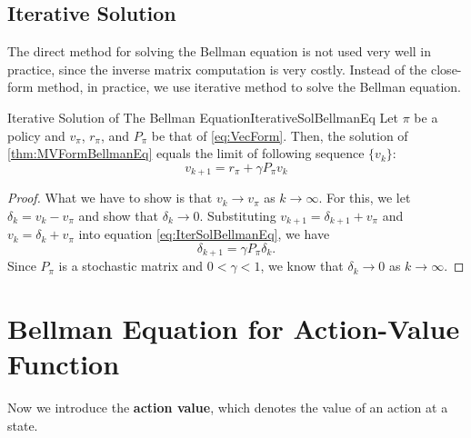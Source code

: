     \subsection{Iterative Solution}
        The direct method for solving the Bellman equation is not used very well in practice, since the inverse matrix computation is very costly.
        Instead of the close-form method, in practice, we use iterative method to solve the Bellman equation.
        \begin{thm}{Iterative Solution of The Bellman Equation}{IterativeSolBellmanEq}
            Let $\pi$ be a policy and $v_\pi$, $r_\pi$, and $P_\pi$ be that of \ref{eq:VecForm}. Then, the
            solution of \ref{thm:MVFormBellmanEq} equals the limit of following sequence $\{v_k\}$:
            \begin{equation}
                v_{k+1}=r_\pi + \gamma P_\pi v_k \label{eq:IterSolBellmanEq}
            \end{equation}
        \end{thm}
        \begin{proof}
            What we have to show is that $v_k \to v_\pi$ as $k \to \infty$. For this, we let $\delta_k = v_k - v_\pi$ and show that $\delta_k \to 0$.
            Substituting $v_{k+1} = \delta_{k+1} + v_\pi$ and $v_k = \delta_k + v_\pi$ into equation \ref{eq:IterSolBellmanEq},
            we have
            \begin{equation}
                \delta_{k+1} = \gamma P_\pi \delta_k.
            \end{equation}
            Since $P_\pi$ is a stochastic matrix and $0 < \gamma < 1$, we know that $\delta_k \to 0$ as $k \to \infty$.
        \end{proof}

\section{Bellman Equation for Action-Value Function}
    Now we introduce the \textbf{action value}, which denotes the value of an action at a state.

